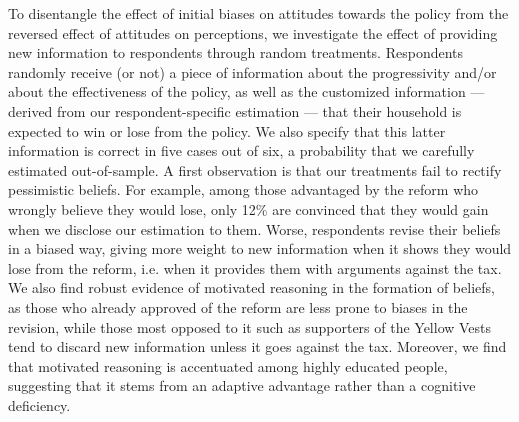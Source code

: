 \documentclass[12pt]{article} %
\begin{document}
To disentangle the effect of initial biases on attitudes towards the policy from the reversed effect of attitudes on perceptions, we investigate the effect of providing new information to respondents through random treatments. Respondents randomly receive (or not) a piece of information about the progressivity and/or about the effectiveness of the policy, as well as the customized information --- derived from our respondent-specific estimation --- that their household is expected to win or lose from the policy. We also specify that this latter information is correct in five cases out of six, a probability that we carefully estimated out-of-sample. A first observation is that our treatments fail to rectify pessimistic beliefs. For example, among those advantaged by the reform who wrongly believe they would lose, only 12\% are convinced that they would gain when we disclose our estimation to them. Worse, respondents revise their beliefs in a biased way, giving more weight to new information when it shows they would lose from the reform, i.e. when it provides them with arguments against the tax. We also find robust evidence of motivated reasoning in the formation of beliefs, as those who already approved of the reform are less prone to biases in the revision, while those most opposed to it such as supporters of the Yellow Vests tend to discard new information unless it goes against the tax. Moreover, we find that motivated reasoning is accentuated among highly educated people, suggesting that it stems from an adaptive advantage rather than a cognitive deficiency. 
\end{document}

